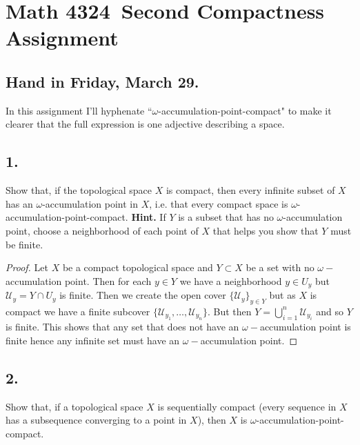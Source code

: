 \documentclass{amsart}
\theoremstyle{plain}
\theoremstyle{definition}
\theoremstyle{remark}
\begin{document}
\section*{Math 4324\  Second Compactness Assignment} 

\subsection*{Hand in Friday, March 29.} 

\vspace{.15in}
In this assignment I'll hyphenate ``$\omega$-accumulation-point-compact" to make it clearer that the full expression is one adjective describing a space. 


\vspace{.15in}
\noindent
\subsection*{1.}  Show that, if the topological space $X$ is compact, then every infinite subset of $X$ has an $\omega$-accumulation point in $X$, i.e. that every compact space is $\omega$-accumulation-point-compact. {\bfseries Hint.} If $Y$ is a subset that has no $\omega$-accumulation point, choose a neighborhood of each point of $X$ that helps you show that $Y$ must be finite. 

\begin{proof}
    Let $X$ be a compact topological space and $Y\subset X$ be a set with no $\omega-$accumulation point. Then for each $y \in Y$ we have a neighborhood $y\in U_y$ but $\mathcal U_y=Y\cap U_y$ is finite. Then we create the open cover $\{\mathcal U_y\}_{y\in Y}$ but as $X$ is compact we have a finite subcover $\{\mathcal U_{y_1},\ldots,\mathcal U_{y_n}\}$. But then $Y= \bigcup_{i=1}^n \mathcal U_{y_i}$ and so $Y$ is finite. This shows that any set that does not have an $\omega-$accumulation point is finite hence any infinite set must have an $\omega-$accumulation point.
\end{proof}


\vspace{.15in}
\noindent
\subsection*{2.} Show that, if a topological space $X$ is sequentially compact (every sequence in $X$ has a subsequence converging to a point in $X$), then $X$ is $\omega$-accumulation-point-compact. 

\vspace{.15in}
\noindent
\end{document}

